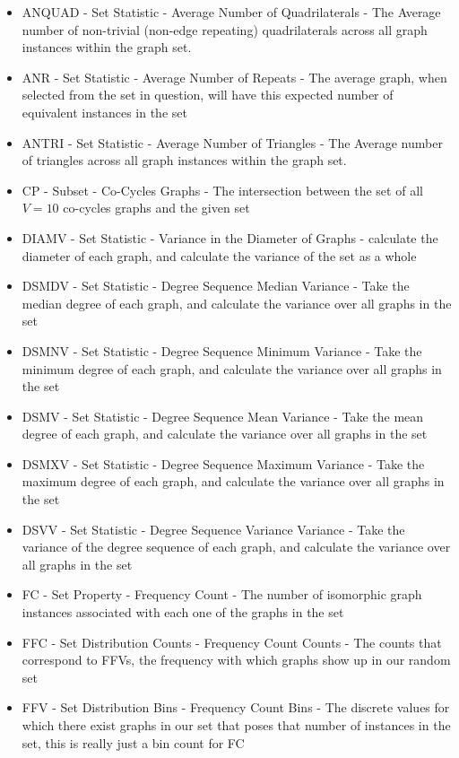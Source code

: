 \begin{itemize}
\item{ANQUAD - Set Statistic - Average Number of Quadrilaterals - The Average number of non-trivial (non-edge repeating) quadrilaterals across all graph instances within the graph set.}
\item{ANR - Set Statistic - Average Number of Repeats - The average graph, when selected from the set in question, will have this expected number of equivalent instances in the set}
\item{ANTRI - Set Statistic - Average Number of Triangles - The Average number of triangles across all graph instances within the graph set.}
\item{CP - Subset - Co-Cycles Graphs - The intersection between the set of all $V=10$ co-cycles graphs and the given set}
\item{DIAMV - Set Statistic - Variance in the Diameter of Graphs - calculate the diameter of each graph, and calculate the variance of the set as a whole}
\item{DSMDV - Set Statistic - Degree Sequence Median Variance - Take the median degree of each graph, and calculate the variance over all graphs in the set}
\item{DSMNV - Set Statistic - Degree Sequence Minimum Variance - Take the minimum degree of each graph, and calculate the variance over all graphs in the set}
\item{DSMV - Set Statistic - Degree Sequence Mean Variance - Take the mean degree of each graph, and calculate the variance over all graphs in the set}
\item{DSMXV - Set Statistic - Degree Sequence Maximum Variance - Take the maximum degree of each graph, and calculate the variance over all graphs in the set}
\item{DSVV - Set Statistic - Degree Sequence Variance Variance - Take the variance of the degree sequence of each graph, and calculate the variance over all graphs in the set}
\item{FC - Set Property - Frequency Count - The number of isomorphic graph instances associated with each one of the graphs in the set}
\item{FFC - Set Distribution Counts - Frequency Count Counts - The counts that correspond to FFVs, the frequency with which graphs show up in our random set}
\item{FFV - Set Distribution Bins - Frequency Count Bins - The discrete values for which there exist graphs in our set that poses that number of instances in the set, this is really just a bin count for FC}

\end{itemize}
